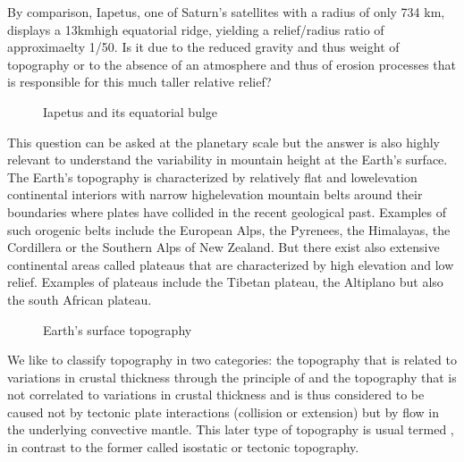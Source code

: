 \documentclass[letterpaper,10pt,english]{jupyterBook}
\let\sphinxpxdimen\pdfpxdimen\else\newdimen\sphinxpxdimen
\begin{document}
\sphinxAtStartPar
By comparison, Iapetus, one of Saturn’s satellites with a radius of only 734 km, displays a 13km\sphinxhyphen{}high equatorial ridge, yielding a relief/radius ratio of approximaelty 1/50. Is it due to the reduced gravity and thus weight of topography or to the absence of an atmosphere and thus of erosion processes that is responsible for this much taller relative relief?

\begin{figure}[htbp]
\centering
\capstart

\noindent\sphinxincludegraphics[height=150\sphinxpxdimen]{{iapetus}.png}
\caption{Iapetus and its equatorial bulge}\label{\detokenize{intro:iapetus}}\end{figure}

\begin{DUlineblock}{0em}
\item[] 
\end{DUlineblock}

\sphinxAtStartPar
This question can be asked at the planetary scale but the answer is also highly relevant to understand the variability in mountain height at the Earth’s surface. The Earth’s topography is characterized by relatively flat and low\sphinxhyphen{}elevation continental interiors with narrow high\sphinxhyphen{}elevation mountain belts around their boundaries where plates have collided in the recent geological past. Examples of such orogenic belts include the European Alps, the Pyrenees, the Himalayas, the Cordillera or the Southern Alps of New Zealand. But there exist also extensive continental areas called plateaus that are characterized by high elevation and low relief. Examples of plateaus include the Tibetan plateau, the Altiplano but also the south African plateau.

\begin{figure}[htbp]
\centering
\capstart

\noindent\sphinxincludegraphics[height=300\sphinxpxdimen]{{worldtopo}.png}
\caption{Earth’s surface topography}\label{\detokenize{intro:worldtopo}}\end{figure}

\begin{DUlineblock}{0em}
\item[] 
\end{DUlineblock}

\sphinxAtStartPar
We like to classify topography in two categories: the topography that is related to variations in crustal thickness through the principle of {\hyperref[\detokenize{glossary:term-Isostasy}]{}} and the topography that is not correlated to variations in crustal thickness and is thus considered to be caused not by tectonic plate interactions (collision or extension) but by flow in the underlying convective mantle. This later type of topography is usual termed {\hyperref[\detokenize{glossary:term-Dynamic-topography}]{}}, in contrast to the former called isostatic or tectonic topography.
\end{document}
